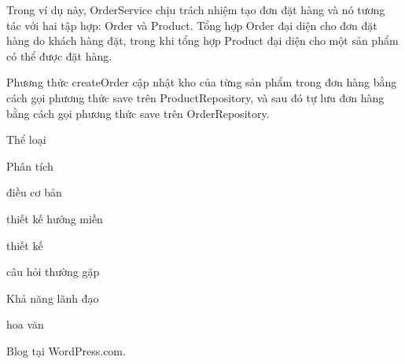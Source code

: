Trong ví dụ này, OrderService chịu trách nhiệm tạo đơn đặt hàng và nó tương tác với hai tập hợp: Order và Product. Tổng hợp Order đại diện cho đơn đặt hàng do khách hàng đặt, trong khi tổng hợp Product đại diện cho một sản phẩm có thể được đặt hàng.

Phương thức createOrder cập nhật kho của từng sản phẩm trong đơn hàng bằng cách gọi phương thức save trên ProductRepository, và sau đó tự lưu đơn hàng bằng cách gọi phương thức save trên OrderRepository.

Thể loại

Phân tích

điều cơ bản

thiết kế hướng miền

thiết kế

câu hỏi thường gặp

Khả năng lãnh đạo

hoa văn

Blog tại WordPress.com.
















